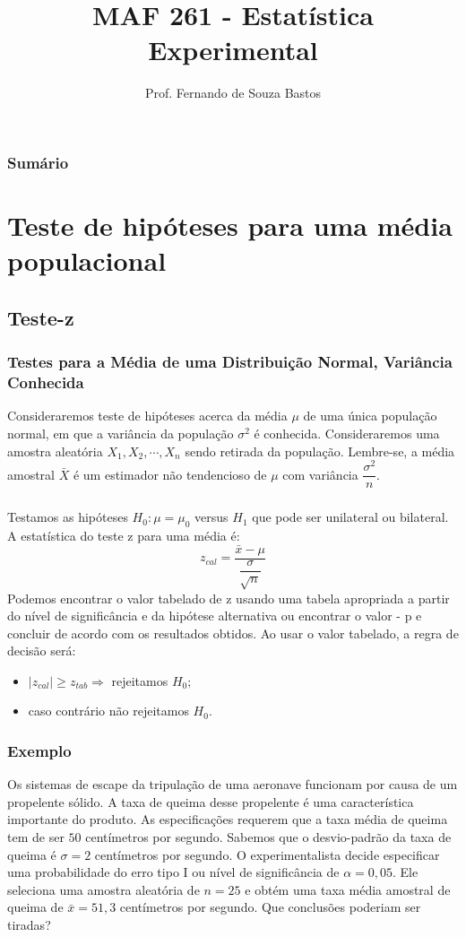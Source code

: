 \documentclass[14pt,aspectratio=1610]{beamer}
\title{MAF 261 - Estatística Experimental}
\author{Prof. Fernando de Souza Bastos}
\institute{Instituto de Ciências Exatas e Tecnológicas\texorpdfstring{\\ Universidade Federal de Viçosa}{}\texorpdfstring{\\ Campus UFV - Florestal}{}}
\date[\today]{}
\newcommand{\bx}{\ensuremath{\bar{x}}}
\newcommand{\Ho}{\ensuremath{H_{0}}}
\newcommand{\Hi}{\ensuremath{H_{1}}}
\begin{document}


\frame{\titlepage}

\begin{frame}{}
\frametitle{\bf Sumário}
\tableofcontents
\end{frame}
\section{Teste de hipóteses para uma média populacional}
\subsection{Teste-z}
\begin{frame}{}
\frametitle{Testes para a Média de uma Distribuição Normal, Variância Conhecida}
\begin{block}{}
\justifying
Consideraremos teste de hipóteses acerca da média $\mu$ de uma única população normal, em que a variância da população $\sigma^{2}$ é conhecida. Consideraremos uma amostra aleatória $X_{1}, X_{2},\cdots, X_{n}$ sendo retirada da população. Lembre-se, a média amostral $\bar{X}$ é um estimador não tendencioso de $\mu$ com 
variância $\dfrac{\sigma^{2}}{n}.$
\end{block}
\end{frame}

\begin{frame}{}
\frametitle{}
\begin{block}{}
\justifying
Testamos as hipóteses $\Ho:\mu=\mu_{0}$ versus $\Hi$ que pode ser unilateral ou bilateral. A estatística do teste z para uma média é:
$$z_{cal}=\dfrac{\bx-\mu}{\dfrac{\sigma}{\sqrt{n}}}$$
Podemos encontrar o valor tabelado de z usando uma tabela apropriada a partir do nível de significância e da hipótese alternativa ou 
encontrar o valor - p e concluir de acordo com os resultados obtidos. Ao usar o valor tabelado, a regra de decisão será:
\begin{itemize}
\item $|z_{cal}|\geq z_{tab}\Rightarrow$ rejeitamos $\Ho;$
\item caso contrário não rejeitamos $\Ho.$
\end{itemize}
\end{block}
\end{frame}

\begin{frame}{}
\frametitle{Exemplo}
\begin{block}{}
\justifying
Os sistemas de escape da tripulação de uma aeronave funcionam por causa de um propelente sólido. A taxa de queima desse propelente é uma característica importante 
do produto. As especificações requerem que a taxa média de queima tem de ser $50$ centímetros por segundo. Sabemos que o desvio-padrão da taxa de queima é 
$\sigma = 2$ centímetros por segundo. O experimentalista decide especificar uma probabilidade do erro tipo I ou nível de significância de $\alpha = 0,05.$ Ele seleciona 
uma amostra aleatória de $n = 25$ e obtém uma taxa média amostral de queima de $\bx = 51,3$ centímetros por segundo. Que conclusões poderiam ser tiradas?
\end{block}
\end{frame}
\end{document}
